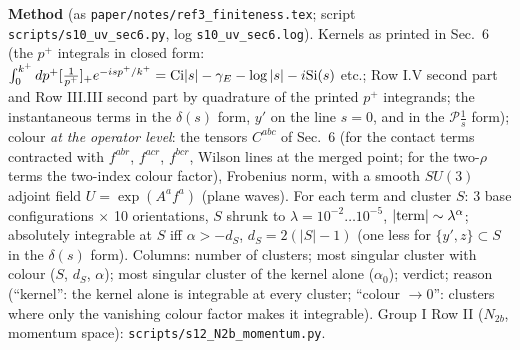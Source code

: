 \documentclass[9pt]{article}
\numberwithin{equation}{section}
\begin{document}
\noindent\textbf{Method} (as \texttt{paper/notes/ref3\_finiteness.tex}; script \texttt{scripts/s10\_uv\_sec6.py}, log \texttt{s10\_uv\_sec6.log}). Kernels as printed in Sec.~6 (the $p^+$ integrals in closed form: $\int_0^{k^+}dp^+[\frac1{p^+}]_+e^{-isp^+/k^+}={\rm Ci}|s|-\gamma_E-\log|s|-i{\rm Si}(s)$ etc.; Row I.V second part and Row III.III second part by quadrature of the printed $p^+$ integrands; the instantaneous terms in the $\delta(s)$ form, $y'$ on the line $s=0$, and in the $\mathcal P\frac1s$ form); colour \emph{at the operator level}: the tensors $C^{abc}$ of Sec.~6 (for the contact terms contracted with $f^{abr}$, $f^{acr}$, $f^{bcr}$, Wilson lines at the merged point; for the two-$\rho$ terms the two-index colour factor), Frobenius norm, with a smooth $SU(3)$ adjoint field $U=\exp(A^af^a)$ (plane waves). For each term and cluster $S$: 3 base configurations $\times$ 10 orientations, $S$ shrunk to $\lambda=10^{-2}\dots10^{-5}$, $|{\rm term}|\sim\lambda^{\alpha}$; absolutely integrable at $S$ iff $\alpha>-d_S$, $d_S=2(|S|-1)$ (one less for $\{y',z\}\subset S$ in the $\delta(s)$ form). Columns: number of clusters; most singular cluster with colour ($S$, $d_S$, $\alpha$); most singular cluster of the kernel alone ($\alpha_0$); verdict; reason (``kernel'': the kernel alone is integrable at every cluster; ``colour $\to0$'': clusters where only the vanishing colour factor makes it integrable). Group I Row II ($N_{2b}$, momentum space): \texttt{scripts/s12\_N2b\_momentum.py}.
\end{document}
